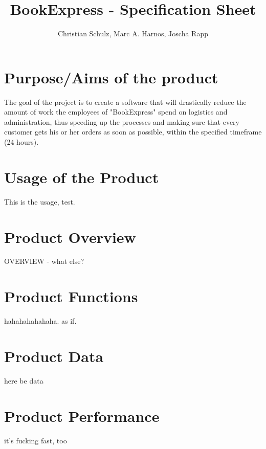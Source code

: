 \documentclass[a4paper]{report}
\author{Christian Schulz, Marc A. Harnos, Joscha Rapp}
\begin{document}
\title{BookExpress - Specification Sheet}
\maketitle
\tableofcontents

\chapter{Purpose/Aims of the product}
\let\clearpage\relax
The goal of the project is to create a software that will drastically reduce the amount of work the employees of "BookExpress" spend on logistics and administration, thus speeding up the processes and making sure that every customer gets his or her orders as soon as possible, within the specified timeframe (24 hours). 
\\
\chapter{Usage of the Product}
This is the usage, test.	
\chapter{Product Overview}
OVERVIEW - what else?
\chapter{Product Functions}
hahahahahahaha. as if.
\chapter{Product Data}
here be data
\chapter{Product Performance}
it's fucking fast, too
\end{document}
